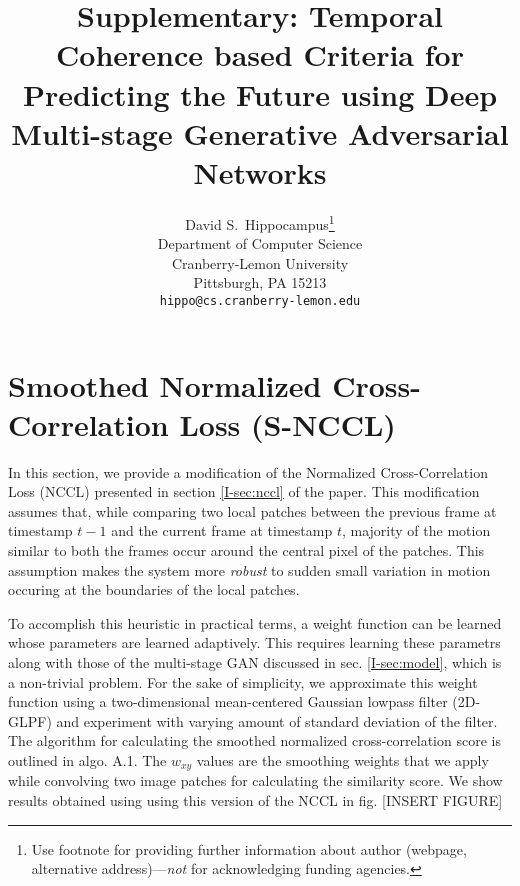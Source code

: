 \documentclass{article}
\title{Supplementary: Temporal Coherence based Criteria for Predicting the Future using Deep Multi-stage Generative Adversarial Networks}
\author{
  David S.~Hippocampus\thanks{Use footnote for providing further
    information about author (webpage, alternative
    address)---\emph{not} for acknowledging funding agencies.} \\
  Department of Computer Science\\
  Cranberry-Lemon University\\
  Pittsburgh, PA 15213 \\
  \texttt{hippo@cs.cranberry-lemon.edu} \\
}
\begin{document}

\maketitle


\section{Smoothed Normalized Cross-Correlation Loss (S-NCCL)}
  \label{sec:snccl}
  In this section, we provide a modification of the Normalized Cross-Correlation Loss (NCCL) presented in section \ref{I-sec:nccl} of the paper. This modification assumes that, while comparing two local patches between the previous frame at timestamp $ t-1 $ and the current frame at timestamp $ t $, majority of the motion similar to both the frames occur around the central pixel of the patches. This assumption makes the system more \textit{robust} to sudden small variation in motion occuring at the boundaries of the local patches.
  
  To accomplish this heuristic in practical terms, a weight function can be learned whose parameters are learned adaptively. This requires learning these parametrs along with those of the multi-stage GAN discussed in sec. \ref{I-sec:model}, which is a non-trivial problem. For the sake of simplicity, we approximate this weight function using a two-dimensional mean-centered Gaussian lowpass filter (2D-GLPF) and experiment with varying amount of standard deviation of the filter. The algorithm for calculating the smoothed normalized cross-correlation score is outlined in algo. A.1. The $ w_{xy} $ values are the smoothing weights that we apply while convolving two image patches for calculating the similarity score.
  We show results obtained using using this version of the NCCL in fig. [INSERT FIGURE]
  
\end{document}
